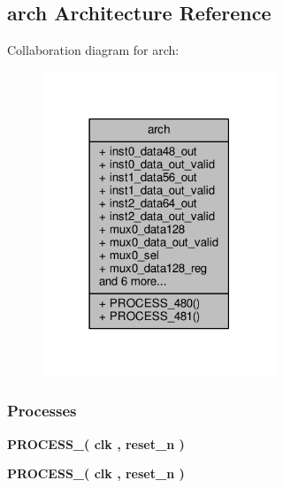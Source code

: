 \subsection{arch Architecture Reference}
\label{classbit__unpack__64_1_1arch}


Collaboration diagram for arch\+:\nopagebreak
\begin{figure}[H]
\begin{center}
\leavevmode
\includegraphics[width=198pt]{dd/d3e/classbit__unpack__64_1_1arch__coll__graph}
\end{center}
\end{figure}
\subsubsection*{Processes}
 \begin{DoxyCompactItemize}
\item 
{\bf P\+R\+O\+C\+E\+S\+S\+\_}{\bfseries  ( {\bfseries {\bfseries {\bf clk}} \textcolor{vhdlchar}{ }} , {\bfseries {\bfseries {\bf reset\+\_\+n}} \textcolor{vhdlchar}{ }} )}
\item 
{\bf P\+R\+O\+C\+E\+S\+S\+\_}{\bfseries  ( {\bfseries {\bfseries {\bf clk}} \textcolor{vhdlchar}{ }} , {\bfseries {\bfseries {\bf reset\+\_\+n}} \textcolor{vhdlchar}{ }} )}
\end{DoxyCompactItemize}
